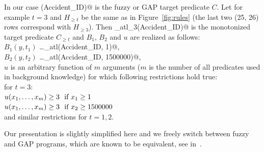 In our case \verb@serious(Accident_ID)@ is the fuzzy or GAP target predicate $C$. Let for example $t=3$ and $H_{\ge t}$ be the same as in Figure~\ref{fig:rules} (the last two (25, 26) rows correspond with $H_{\ge 3}$). Then \verb@serious_atl_3(Accident_ID)@ is the monotonized target predicate $C_{\ge t}$ and $B_1$, $B_2$ and $u$ are realized as follows:\\
\hspace*{1cm}$B_1(y,t_1)$ \dots \verb@fatalities_atl(Accident_ID, 1)@,\\
\hspace*{1cm}$B_2(y,t_2)$ \dots \verb@damage_atl(Accident_ID, 1500000)@,\\
$u$ is an arbitrary function of $m$ arguments ($m$ is the number of all predicates used in background knowledge) for which following restrictions hold true:\\
for $t=3$:\\
\hspace*{1cm}$u(x_1,\dots,x_m) \ge 3 \ \hbox{ if }x_1\ge 1$\\
\hspace*{1cm}$u(x_1,\dots,x_m) \ge 3 \ \hbox{ if }x_2\ge 1500000$\\
and similar restrictions for $t=1,2$.


\bigskip
Our presentation is slightly simplified here and we freely switch between fuzzy and GAP programs, which are known to be equivalent, see in~\citep{biblio:KLV}.




